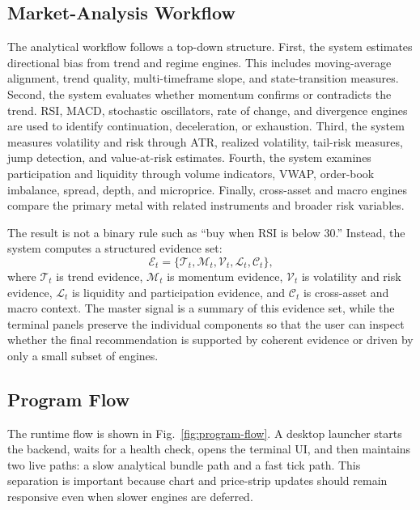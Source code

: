 \documentclass[conference]{IEEEtran}
\begin{document}
\subsection{Market-Analysis Workflow}

The analytical workflow follows a top-down structure. First, the system
estimates directional bias from trend and regime engines. This includes
moving-average alignment, trend quality, multi-timeframe slope, and
state-transition measures. Second, the system evaluates whether momentum
confirms or contradicts the trend. RSI, MACD, stochastic oscillators, rate of
change, and divergence engines are used to identify continuation,
deceleration, or exhaustion. Third, the system measures volatility and risk
through ATR, realized volatility, tail-risk measures, jump detection, and
value-at-risk estimates. Fourth, the system examines participation and
liquidity through volume indicators, VWAP, order-book imbalance, spread,
depth, and microprice. Finally, cross-asset and macro engines compare the
primary metal with related instruments and broader risk variables.

The result is not a binary rule such as ``buy when RSI is below 30.'' Instead,
the system computes a structured evidence set:
\begin{equation}
\mathcal{E}_t =
\{\mathcal{T}_t,\mathcal{M}_t,\mathcal{V}_t,\mathcal{L}_t,\mathcal{C}_t\},
\end{equation}
where $\mathcal{T}_t$ is trend evidence, $\mathcal{M}_t$ is momentum
evidence, $\mathcal{V}_t$ is volatility and risk evidence, $\mathcal{L}_t$ is
liquidity and participation evidence, and $\mathcal{C}_t$ is cross-asset and
macro context. The master signal is a summary of this evidence set, while
the terminal panels preserve the individual components so that the user can
inspect whether the final recommendation is supported by coherent evidence
or driven by only a small subset of engines.

\subsection{Program Flow}

The runtime flow is shown in Fig.~\ref{fig:program-flow}. A desktop launcher
starts the backend, waits for a health check, opens the terminal UI, and then
maintains two live paths: a slow analytical bundle path and a fast tick path.
This separation is important because chart and price-strip updates should
remain responsive even when slower engines are deferred.
\end{document}
